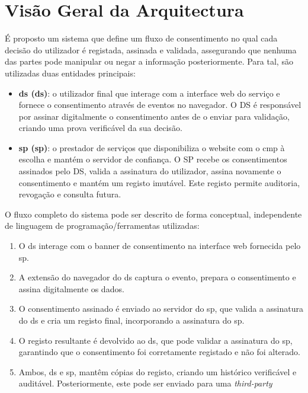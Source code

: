 \chapter{Visão Geral da Arquitectura}
\label{cap:arquitectura}

É proposto um sistema que define um fluxo de consentimento no qual cada decisão do utilizador é registada, assinada e validada, assegurando que nenhuma das partes pode manipular ou negar a informação posteriormente. Para tal, são utilizadas duas entidades principais:

\begin{itemize}
    \item \textbf{\acrlong{ds} (\acrshort{ds})}: o utilizador final que interage com a interface web do serviço e fornece o consentimento através de eventos no navegador. O DS é responsável por assinar digitalmente o consentimento antes de o enviar para validação, criando uma prova verificável da sua decisão.
    \item \textbf{\acrlong{sp} (\acrshort{sp})}: o prestador de serviços que disponibiliza o website com o \acrshort{cmp} à escolha e mantém o servidor de confiança. O SP recebe os consentimentos assinados pelo DS, valida a assinatura do utilizador, assina novamente o consentimento e mantém um registo imutável. Este registo permite auditoria, revogação e consulta futura.
\end{itemize}

O fluxo completo do sistema pode ser descrito de forma conceptual, independente de linguagem de programação/ferramentas utilizadas:

\begin{enumerate}
    \item O \acrshort{ds} interage com o banner de consentimento na interface web fornecida pelo \acrshort{sp}.
    \item A extensão do navegador do \acrshort{ds} captura o evento, prepara o consentimento e assina digitalmente os dados.
    \item O consentimento assinado é enviado ao servidor do \acrshort{sp}, que valida a assinatura do \acrshort{ds} e cria um registo final, incorporando a assinatura do \acrshort{sp}.
    \item O registo resultante é devolvido ao \acrshort{ds}, que pode validar a assinatura do \acrshort{sp}, garantindo que o consentimento foi corretamente registado e não foi alterado.
    \item Ambos, \acrshort{ds} e \acrshort{sp}, mantêm cópias do registo, criando um histórico verificável e auditável. Posteriormente, este pode ser enviado para uma \textit{third-party}
\end{enumerate}

